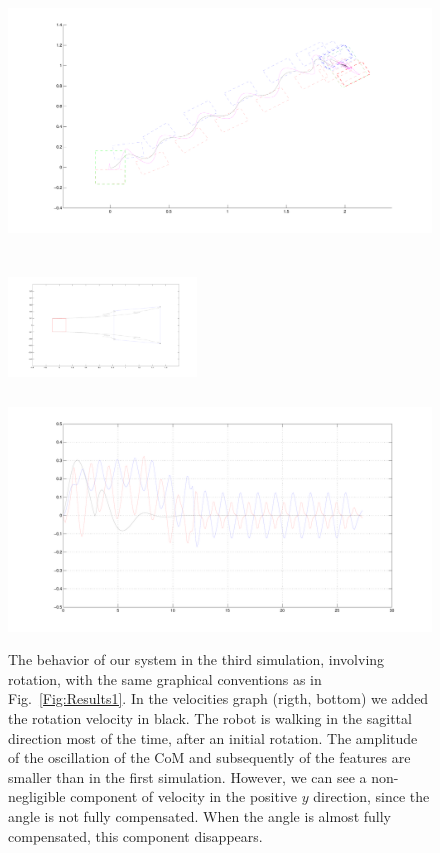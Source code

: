 \begin{figure}[h]
\begin{minipage}{0.5\textwidth}
 \centering
 \includegraphics[scale=.3]{Chap4-Visual-Servoing/steps3_hrp2.pdf}
\end{minipage}
\begin{minipage}{0.5\textwidth}
 \centering
 \includegraphics[width=5cm,height=4cm]{Chap4-Visual-Servoing/features3_hrp2.pdf}
\\
 \includegraphics[scale=.2]{Chap4-Visual-Servoing/vels3_hrp2.pdf}
\end{minipage}
 \caption[]{\label{Fig:Results3}\small{The behavior of our system in the third simulation, involving rotation, with the same graphical conventions as in Fig.~\ref{Fig:Results1}. In the velocities graph (rigth, bottom) we added the rotation velocity in black. The robot is walking in the sagittal direction most of the time, after an initial rotation. The amplitude of the oscillation of the CoM and subsequently of the features are smaller than in the first simulation. However, we can see a non-negligible component of velocity in the positive $y$ direction, since the angle is not fully compensated. When the angle is almost fully compensated, this component disappears.}}
 \end{figure}

